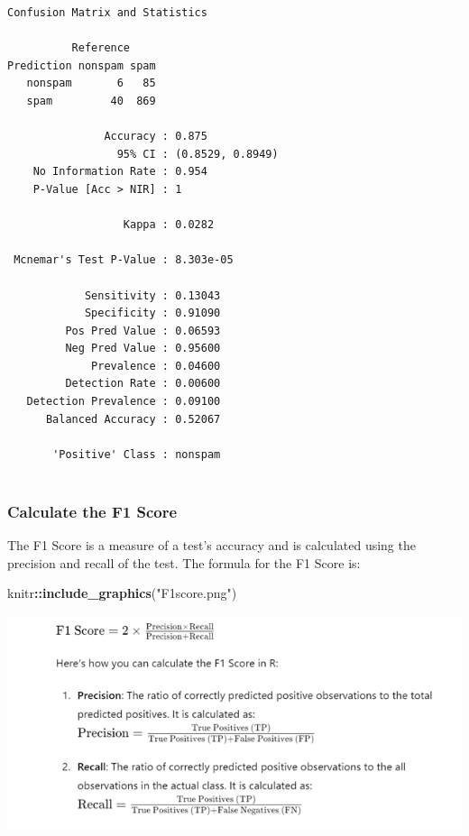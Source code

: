 \documentclass[
]{article}
\newenvironment{Shaded}{\begin{snugshade}}{\end{snugshade}}
\newcommand{\FunctionTok}[1]{\textcolor[rgb]{0.13,0.29,0.53}{\textbf{#1}}}
\newcommand{\NormalTok}[1]{#1}
\newcommand{\SpecialCharTok}[1]{\textcolor[rgb]{0.81,0.36,0.00}{\textbf{#1}}}
\newcommand{\StringTok}[1]{\textcolor[rgb]{0.31,0.60,0.02}{#1}}
\begin{document}
\begin{verbatim}
Confusion Matrix and Statistics

          Reference
Prediction nonspam spam
   nonspam       6   85
   spam         40  869
                                          
               Accuracy : 0.875           
                 95% CI : (0.8529, 0.8949)
    No Information Rate : 0.954           
    P-Value [Acc > NIR] : 1               
                                          
                  Kappa : 0.0282          
                                          
 Mcnemar's Test P-Value : 8.303e-05       
                                          
            Sensitivity : 0.13043         
            Specificity : 0.91090         
         Pos Pred Value : 0.06593         
         Neg Pred Value : 0.95600         
             Prevalence : 0.04600         
         Detection Rate : 0.00600         
   Detection Prevalence : 0.09100         
      Balanced Accuracy : 0.52067         
                                          
       'Positive' Class : nonspam         
                                          
\end{verbatim}

\subsubsection{Calculate the F1 Score}\label{calculate-the-f1-score}

The F1 Score is a measure of a test's accuracy and is calculated using
the precision and recall of the test. The formula for the F1 Score is:

\begin{Shaded}
\begin{Highlighting}[]
\NormalTok{knitr}\SpecialCharTok{::}\FunctionTok{include\_graphics}\NormalTok{(}\StringTok{"F1score.png"}\NormalTok{)}
\end{Highlighting}
\end{Shaded}

\includegraphics[width=8.67in]{F1score}
\end{document}
